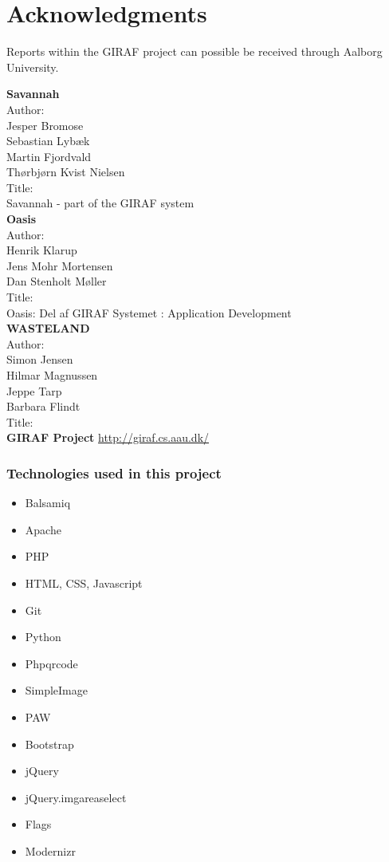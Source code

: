 \chapter{Acknowledgments}
\label{acknowledgement}
Reports within the GIRAF project can possible be received through Aalborg University.   

\textbf{Savannah}\\
Author:\\ 
Jesper Bromose\\
Sebastian Lybæk\\
Martin Fjordvald\\
Thørbjørn Kvist Nielsen\\

Title:\\
Savannah - part of the GIRAF system\\

\textbf{Oasis}\\
Author:\\
Henrik Klarup\\
Jens Mohr Mortensen\\
Dan Stenholt Møller\\

Title:\\
Oasis: Del af GIRAF Systemet : Application Development\\


\textbf{WASTELAND}\\
Author:\\
Simon Jensen\\
Hilmar Magnussen\\
Jeppe Tarp\\
Barbara Flindt\\
Title:\\

\textbf{GIRAF Project}
\url{http://giraf.cs.aau.dk/}\\

\subsection{Technologies used in this project}
\begin{itemize}
\item Balsamiq
\item Apache
\item PHP
\item HTML, CSS, Javascript
\item Git
\item Python
\item Phpqrcode
\item SimpleImage
\item PAW
\item Bootstrap
\item jQuery
\item jQuery.imgareaselect
\item Flags
\item Modernizr
\end{itemize}